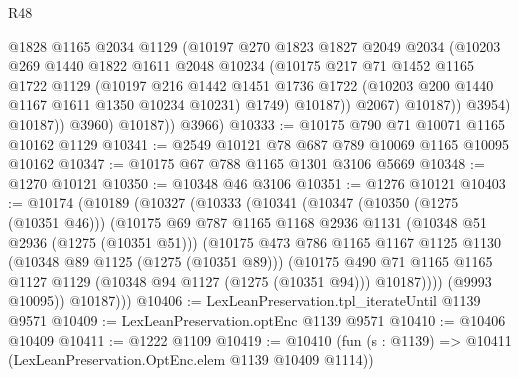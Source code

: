 \begin{lexlean}{R48}
\begin{coremodule}
                      @1828
                      @1165
                      @2034
                      @1129
                      (@10197
                        @270
                        @1823
                        @1827
                        @2049
                        @2034
                        (@10203
                          @269
                          @1440
                          @1822
                          @1611
                          @2048
                          @10234
                          (@10175
                            @217
                            @71
                            @1452
                            @1165
                            @1722
                            @1129
                            (@10197
                              @216
                              @1442
                              @1451
                              @1736
                              @1722
                              (@10203 @200 @1440 @1167 @1611 @1350 @10234 @10231)
                              @1749)
                            @10187))
                        @2067)
                      @10187))
                  @3954)
                @10187))
            @3960)
          @10187))
      @3966)
@10333 := @10175 @790 @71 @10071 @1165 @10162 @1129
@10341 := @2549 @10121 @78 @687 @789 @10069 @1165 @10095 @10162
@10347 := @10175 @67 @788 @1165 @1301 @3106 @5669
@10348 := @1270 @10121
@10350 := @10348 @46 @3106
@10351 := @1276 @10121
@10403 := @10174
    (@10189
      (@10327
        (@10333
          (@10341
            (@10347
              (@10350 (@1275 (@10351 @46)))
              (@10175
                @69
                @787
                @1165
                @1168
                @2936
                @1131
                (@10348 @51 @2936 (@1275 (@10351 @51)))
                (@10175
                  @473
                  @786
                  @1165
                  @1167
                  @1125
                  @1130
                  (@10348 @89 @1125 (@1275 (@10351 @89)))
                  (@10175
                    @490
                    @71
                    @1165
                    @1165
                    @1127
                    @1129
                    (@10348 @94 @1127 (@1275 (@10351 @94)))
                    @10187))))
            (@9993 @10095))
          @10187)))
@10406 := LexLeanPreservation.tpl_iterateUntil @1139 @9571
@10409 := LexLeanPreservation.optEnc @1139 @9571
@10410 := @10406 @10409
@10411 := @1222 @1109
@10419 := @10410
    (fun (s : @1139) => @10411 (LexLeanPreservation.OptEnc.elem @1139 @10409 @1114))

\end{coremodule}
\end{lexlean}

